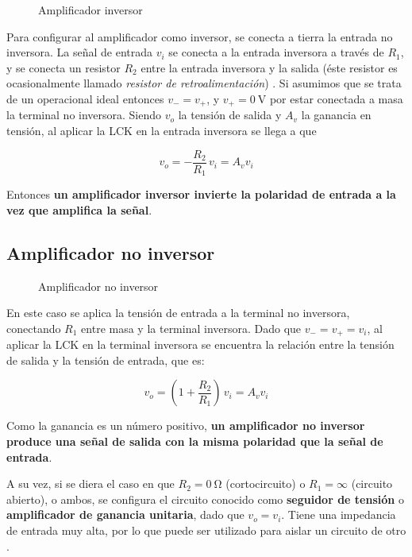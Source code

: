 
\begin{wrapfigure}{r}{0.4\textwidth}
    \centering
    
    \caption{Amplificador inversor}
    \label{fig:intro:opamp-inversor}
\end{wrapfigure}


Para configurar al amplificador como inversor, se conecta a tierra la entrada no inversora. La señal de entrada $v_i$ se conecta a la entrada inversora a través de $R_1$, y se conecta un resistor $R_2$ entre la entrada inversora y la salida (éste resistor es ocasionalmente llamado \textit{resistor de retroalimentación}) \cite[pág. 181]{FDCE}.
Si asumimos que se trata de un operacional ideal entonces $v_{-} = v_{+}$, y $v_{+} = \SI{0}{\volt}$ por estar conectada a masa la terminal no inversora. Siendo $v_o$ la tensión de salida y $A_v$ la ganancia en tensión, al aplicar la LCK en la entrada inversora se llega a que

\begin{equation}
    \label{ec:intro:opamp-inversor}
    v_o = - \frac{R_2}{R_1} \, v_i = A_v v_i
\end{equation}

Entonces \textbf{un amplificador inversor invierte la polaridad de entrada a la vez que amplifica la señal}.

\subsection{Amplificador no inversor}
\label{sec:intro:opamp-noinversor}


\begin{wrapfigure}{r}{0.4\textwidth}
    \centering
    
    \caption{Amplificador no inversor}
    \label{fig:intro:opamp-no-inversor}
\end{wrapfigure}

En este caso se aplica la tensión de entrada a la terminal no inversora, conectando $R_1$ entre masa y la terminal inversora. Dado que $v_{-} = v_{+} = v_i$, al aplicar la LCK en la terminal inversora se encuentra la relación entre la tensión de salida y la tensión de entrada, que es:

\begin{equation}
    \label{ec:intro:opamp-noinversor}
    v_o = \left(1 + \frac{R_2}{R_1}\right) \, v_i = A_v v_i
\end{equation}

Como la ganancia es un número positivo, \textbf{un amplificador no inversor produce una señal de salida con la misma polaridad que la señal de entrada}.

A su vez, si se diera el caso en que $R_2 = \SI{0}{\ohm}$ (cortocircuito) o $R_1 = \infty$ (circuito abierto), o ambos, se configura el circuito conocido como \textbf{seguidor de tensión} o \textbf{amplificador de ganancia unitaria}, dado que $v_o = v_i$. Tiene una impedancia de entrada muy alta, por lo que puede ser utilizado para aislar un circuito de otro \cite[pág. 184]{FDCE}.
